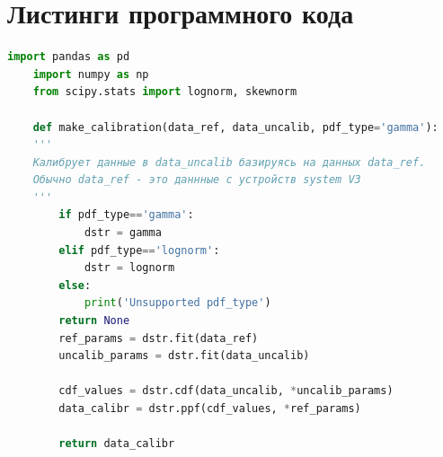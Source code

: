 


\chapter{Листинги программного кода}\label{app:A}

\begin{ListingEnv}[!h]%
    \captiondelim{ } %
    \caption{Основной фрагмент программы calibration.py, используемый для калибровки данных из системы RIPE Atlas}\label{lst:calib}
    \begin{lstlisting}[language={Python}]
	import pandas as pd
	import numpy as np
	from scipy.stats import lognorm, skewnorm
	
	def make_calibration(data_ref, data_uncalib, pdf_type='gamma'):
	'''
	Калибрует данные в data_uncalib базируясь на данных data_ref. 
	Обычно data_ref - это даннные с устройств system V3
	'''
		if pdf_type=='gamma':
			dstr = gamma
		elif pdf_type=='lognorm':
			dstr = lognorm
		else:
			print('Unsupported pdf_type')
		return None
		ref_params = dstr.fit(data_ref)
		uncalib_params = dstr.fit(data_uncalib)
		
		cdf_values = dstr.cdf(data_uncalib, *uncalib_params)
		data_calibr = dstr.ppf(cdf_values, *ref_params)
		
		return data_calibr
	
    \end{lstlisting}
\end{ListingEnv}%


\chapter{ }\label{app:B}


